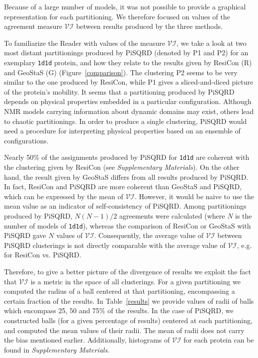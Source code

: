\documentclass[a4paper,11pt,twoside]{book}%
\begin{document}
Because of a large number of models, it was not possible to provide a graphical representation for each partitioning.
We therefore focused on values of the agreement measure $\mathcal{VI}$ between results produced by the three methods.

To familiarize the Reader with values of the measure $\mathcal{VI}$, we take a look at two most distant partitionings produced by PiSQRD (denoted by P1 and P2) for an exemplary \texttt{1d1d} protein, and how they relate to the results given by ResiCon (R) and GeoStaS (G) (Figure~\ref{comparison}).
The clustering P2 seems to be very similar to the one produced by ResiCon, while P1 gives a sliced-and-diced picture of the protein's mobility.
It seems that a partitioning produced by PiSQRD depends on physical properties embedded in a particular configuration.
Although NMR models carrying information about dynamic domains may exist, others lead to chaotic partitionings.
In order to produce a single clustering, PiSQRD would need a procedure for interpreting physical properties based on an ensemble of configurations.

Nearly 50\% of the assignments produced by PiSQRD for \texttt{1d1d} are coherent with the clustering given by ResiCon (see \emph{Supplementary Materials}).
On the other hand, the result given by GeoStaS differs from all results produced by PiSQRD.
In fact, ResiCon and PiSQRD are more coherent than GeoStaS and PiSQRD, which can be expressed by the mean of $\mathcal{VI}$.
However, it would be naive to use the mean value as an indicator of self-consistency of PiSQRD.
Among partitionings produced by PiSQRD, $N(N-1)/2$ agreements were calculated (where $N$ is the number of models of \texttt{1d1d}), whereas the comparison of ResiCon or GeoStaS with PiSQRD gave $N$ values of $\mathcal{VI}$.
Consequently, the average value of $\mathcal{VI}$ between PiSQRD clusterings is not directly comparable with the average value of $\mathcal{VI}$, e.g. for ResiCon vs. PiSQRD.

Therefore, to give a better picture of the divergence of results we exploit the fact that $\mathcal{VI}$ is a metric in the space of all clusterings.
For a given partitioning we computed the radius of a ball %
 centered at that partitioning, encompassing a certain fraction of the results.
In Table~\ref{results} we provide values of radii of balls which encompass 25, 50 and 75\% of the results.
In the case of PiSQRD, we constructed balls (for a given percentage of results) centered at each partitioning, and computed the mean values of their radii.
The mean of radii does not carry the bias mentioned earlier.
Additionally, histograms of $\mathcal{VI}$ for each protein can be found in \emph{Supplementary Materials}.
\end{document}
